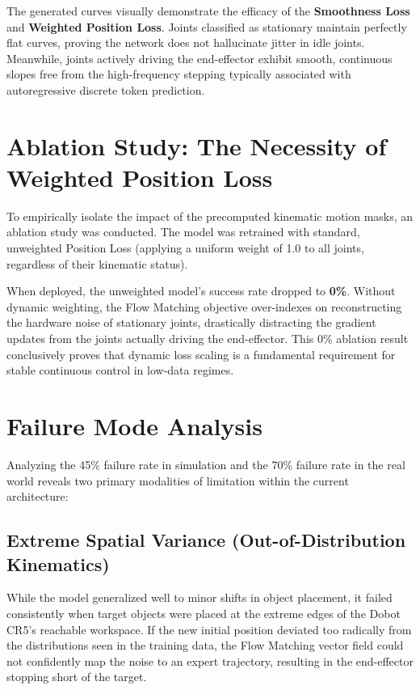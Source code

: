 The generated curves visually demonstrate the efficacy of the \textbf{Smoothness Loss} and \textbf{Weighted Position Loss}. Joints classified as stationary maintain perfectly flat curves, proving the network does not hallucinate jitter in idle joints. Meanwhile, joints actively driving the end-effector exhibit smooth, continuous slopes free from the high-frequency stepping typically associated with autoregressive discrete token prediction.

\section{Ablation Study: The Necessity of Weighted Position Loss}
\label{sec:ablation_loss}

To empirically isolate the impact of the precomputed kinematic motion masks, an ablation study was conducted. The model was retrained with standard, unweighted Position Loss (applying a uniform weight of 1.0 to all joints, regardless of their kinematic status). 

When deployed, the unweighted model's success rate dropped to \textbf{0\%}. Without dynamic weighting, the Flow Matching objective over-indexes on reconstructing the hardware noise of stationary joints, drastically distracting the gradient updates from the joints actually driving the end-effector. This 0\% ablation result conclusively proves that dynamic loss scaling is a fundamental requirement for stable continuous control in low-data regimes.

\section{Failure Mode Analysis}
\label{sec:failure_modes}

Analyzing the 45\% failure rate in simulation and the 70\% failure rate in the real world reveals two primary modalities of limitation within the current architecture:

\subsection{Extreme Spatial Variance (Out-of-Distribution Kinematics)}
While the model generalized well to minor shifts in object placement, it failed consistently when target objects were placed at the extreme edges of the Dobot CR5's reachable workspace. If the new initial position deviated too radically from the distributions seen in the training data, the Flow Matching vector field could not confidently map the noise to an expert trajectory, resulting in the end-effector stopping short of the target.

